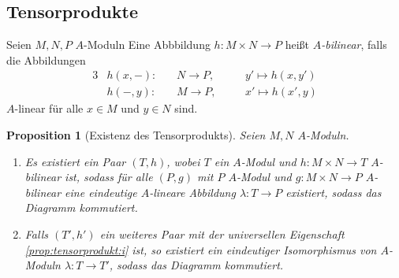 \documentclass[12pt,a4paper]{scrartcl}
\theoremstyle{cplain}
\newtheorem{prop}[thmcounter]{Proposition}
\theoremstyle{cdef}
\begin{document}
\subsection{Tensorprodukte}
\begin{defi}
	Seien $M,N,P$ $A$-Moduln Eine Abbbildung $h\colon M \times N \to P$ heißt \emph{$A$-bilinear}, falls die Abbildungen
	\begin{alignat*}{3}
		&h(x,-)\colon \, &&N \to P, \quad &&y' \mapsto h(x,y') \\
		&h(-,y)\colon \, &&M \to P, \quad &&x' \mapsto h(x',y)
	\end{alignat*}
	$A$-linear für alle $x \in M$ und $y \in N$ sind.
\end{defi}
\begin{prop}[Existenz des Tensorprodukts] \label{prop:tensorprodukt}
	Seien $M,N$ $A$-Moduln.
	\begin{enumerate}
		\item Es existiert ein Paar $(T,h)$, wobei $T$ ein $A$-Modul und $h\colon M \times N \to T$ $A$-bilinear ist, sodass für alle $(P,g)$ mit $P$ $A$-Modul und $g\colon M \times N \to P$ $A$-bilinear eine eindeutige $A$-lineare Abbildung $\lambda\colon T \to P$ existiert, sodass das Diagramm  kommutiert. \label{prop:tensorprodukt:i}
		\item Falls $(T',h')$ ein weiteres Paar mit der universellen Eigenschaft \ref{prop:tensorprodukt:i} ist, so existiert ein eindeutiger Isomorphismus von $A$-Moduln $\lambda\colon T \to T'$, sodass das Diagramm  kommutiert. \label{prop:tensorprodukt:ii}
	\end{enumerate}
	\begin{figure}[H]
		\begin{subfigure}[b]{.49\linewidth}
			\centering
			\caption{}
			\label{prop:tensorprodukt:a}
		\end{subfigure}
		\begin{subfigure}[b]{.49\linewidth}
			\centering
			\caption{}
			\label{prop:tensorprodukt:b}
		\end{subfigure}
	\end{figure}
\end{prop}
\end{document}
